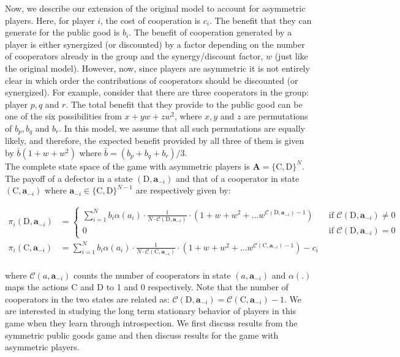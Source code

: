 \documentclass[11pt]{article}
\theoremstyle{plainCl1}
\theoremstyle{plainCl2}
\newcommand{\A}{\mathbf{A}}
\newcommand{\abf}{\mathbf{a}}
\newcommand{\C}{\mathrm{C}}
\newcommand{\D}{\mathrm{D}}
\begin{document}
\noindent Now, we describe our extension of the original model to account for asymmetric players. Here, for player $i$, the cost of cooperation is $c_i$. The benefit that they can generate for the public good is $b_i$. The benefit of cooperation generated by a player is either synergized (or discounted) by a factor depending on the number of cooperators already in the group and the synergy/discount factor, $w$ (just like the original model). However, now, since players are asymmetric it is not entirely clear in which order the contributions of cooperators should be discounted (or synergized). For example, consider that there are three cooperators in the group: player $p, q$ and $r$. The total benefit that they provide to the public good can be one of the six possibilities from $x + y w + z w^2$, where $x,y$ and $z$ are permutations  of $b_p, b_q$ and $b_r$. In this model, we assume that all such permutations are equally likely, and therefore, the expected benefit provided by all three of them is given by $\bar{b}(1 + w + w^2)$ where $\bar{b} = (b_p + b_q + b_r)/3$. \\ 

\noindent The complete state space of the game with asymmetric players is $\A = \{\C,\D\}^N$. The payoff of a defector in a state $(\D, \abf_{-i})$ and that of a cooperator in state $(\C,\abf_{-i})$ where $\abf_{-i} \in \{\C,\D\}^{N-1}$ are respectively given by:

\begin{align}
\pi_i(\D, \abf_{-i})&= 
\begin{cases}
\displaystyle \sum_{i=1}^N b_i \alpha(a_i) \cdot \frac{1}{N \cdot \mathcal{C}(\D,\abf_{-i})} \cdot \left(1 + w + w^2 + ...w^{\mathcal{C}(\D,\abf_{-i}) - 1} \right) &\quad  \text{if } \mathcal{C}(\D,\abf_{-i}) \neq 0 \\[15pt]
0 &\quad  \text{if } \mathcal{C}(\D,\abf_{-i}) = 0
\end{cases} \\[15pt]
\pi_i(\C, \abf_{-i}) &= \displaystyle \sum_{i=1}^N b_i \alpha(a_i) \cdot \frac{1}{N \cdot \mathcal{C}(\C,\abf_{-i})} \cdot \left(1 + w + w^2 + ...w^{\mathcal{C}(\C,\abf_{-i}) - 1} \right) - c_i
\label{Eq:payoff-synergistic-asymmetric}
\end{align} \\
\noindent where $\mathcal{C}(a,\abf_{-i})$ counts the number of cooperators in state $(a,\abf_{-i})$ and $\alpha(.)$ maps the actions $\C$ and $\D$ to 1 and 0 respectively. Note that the number of cooperators in the two states are related as: $\mathcal{C}(\D,\abf_{-i}) = \mathcal{C}(\C,\abf_{-i}) - 1$. We are interested in studying the long term stationary behavior of players in this game when they learn through introspection. We first discuss results from the symmetric public goods game and then discuss results for the game with asymmetric players.\\
\end{document}

